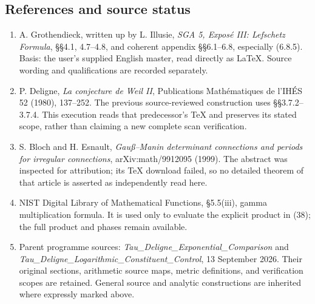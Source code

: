 \subsection{References and source status}\label{endpoint-sga_trace_period--references-and-source-status}

\begin{enumerate}
\def\labelenumi{\arabic{enumi}.}
\tightlist
\item
  A. Grothendieck, written up by L. Illusie, \emph{SGA 5, Exposé III: Lefschetz Formula}, §§4.1, 4.7--4.8, and coherent appendix §§6.1--6.8, especially (6.8.5). Basis: the user's supplied English master, read directly as LaTeX. Source wording and qualifications are recorded separately.
\item
  P. Deligne, \emph{La conjecture de Weil II}, Publications Mathématiques de l'IHÉS 52 (1980), 137--252. The previous source-reviewed construction uses §§3.7.2--3.7.4. This execution reads that predecessor's TeX and preserves its stated scope, rather than claiming a new complete scan verification.
\item
  S. Bloch and H. Esnault, \emph{Gauß--Manin determinant connections and periods for irregular connections}, arXiv:math/9912095 (1999). The abstract was inspected for attribution; its TeX download failed, so no detailed theorem of that article is asserted as independently read here.
\item
  NIST Digital Library of Mathematical Functions, §5.5(iii), gamma multiplication formula. It is used only to evaluate the explicit product in (38); the full product and phases remain available.
\item
  Parent programme sources: \emph{Tau\_Deligne\_Exponential\_Comparison} and \emph{Tau\_Deligne\_Logarithmic\_Constituent\_Control}, 13 September 2026. Their original sections, arithmetic source maps, metric definitions, and verification scopes are retained. General source and analytic constructions are inherited where expressly marked above.
\end{enumerate}
